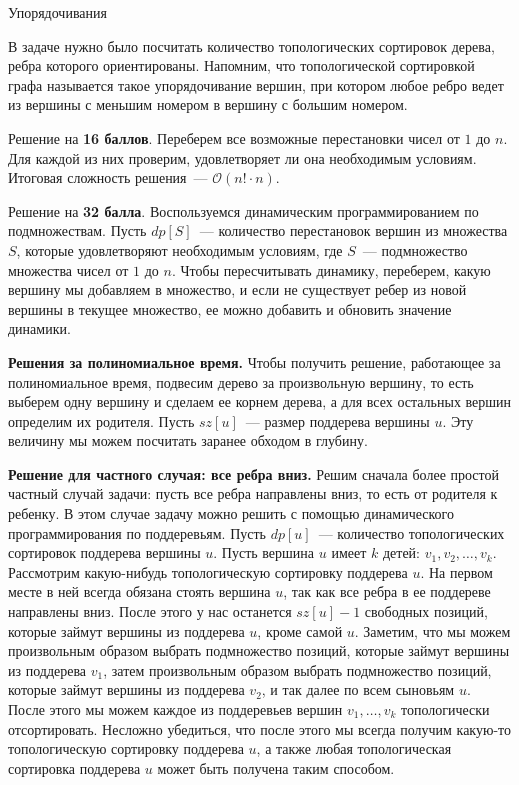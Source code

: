 \begin{tutorial}{Упорядочивания}

В задаче нужно было посчитать количество топологических сортировок дерева, ребра которого ориентированы. Напомним, что топологической сортировкой графа называется такое упорядочивание вершин, при котором любое ребро ведет из вершины с меньшим номером в вершину с большим номером.

Решение на \textbf{16 баллов}. Переберем все возможные перестановки чисел от $1$ до $n$. Для каждой из них проверим, удовлетворяет ли она необходимым условиям. Итоговая сложность решения~--- $\mathcal{O}(n! \cdot n)$.

Решение на \textbf{32 балла}. Воспользуемся динамическим программированием по подмножествам. Пусть $dp[S]$~--- количество перестановок вершин из множества $S$, которые удовлетворяют необходимым условиям, где $S$~--- подмножество множества чисел от $1$ до $n$. Чтобы пересчитывать динамику, переберем, какую вершину мы добавляем в множество, и если не существует ребер из новой вершины в текущее множество, ее можно добавить и обновить значение динамики.

\textbf{Решения за полиномиальное время.}
Чтобы получить решение, работающее за полиномиальное время, подвесим дерево за произвольную вершину, то есть выберем одну вершину и сделаем ее корнем дерева, а для всех остальных вершин определим их родителя. Пусть $sz[u]$~--- размер поддерева вершины $u$. Эту величину мы можем посчитать заранее обходом в глубину.

\textbf{Решение для частного случая: все ребра вниз.}
Решим сначала более простой частный случай задачи: пусть все ребра направлены вниз, то есть от родителя к ребенку. В этом случае задачу можно решить с помощью динамического программирования по поддеревьям. Пусть $dp[u]$~--- количество топологических сортировок поддерева вершины $u$. Пусть вершина $u$ имеет $k$ детей: $v_1, v_2, \ldots, v_k$. Рассмотрим какую-нибудь топологическую сортировку поддерева $u$. На первом месте в ней всегда обязана стоять вершина $u$, так как все ребра в ее поддереве направлены вниз. После этого у нас останется $sz[u] - 1$ свободных позиций, которые займут вершины из поддерева $u$, кроме самой $u$. Заметим, что мы можем произвольным образом выбрать подмножество позиций, которые займут вершины из поддерева $v_1$, затем произвольным образом выбрать подмножество позиций, которые займут вершины из поддерева $v_2$, и так далее по всем сыновьям $u$. После этого мы можем каждое из поддеревьев вершин $v_1, \ldots, v_k$ топологически отсортировать. Несложно убедиться, что после этого мы всегда получим какую-то топологическую сортировку поддерева $u$, а также любая топологическая сортировка поддерева $u$ может быть получена таким способом.


\end{tutorial}
